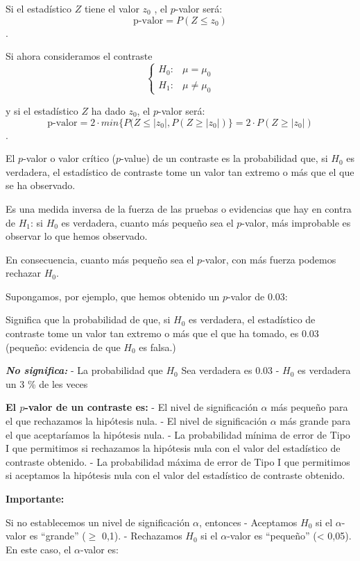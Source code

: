 \documentclass[
]{article}
\begin{document}
Si el estadístico \(Z\) tiene el valor \(z_0\) , el \(p\)-valor será:
\[ \text{p-valor} = P(Z \leq z_0)\].

Si ahora consideramos el contraste \[
\begin{cases}
H_0 : & \mu = \mu_0\\
H_1 : & \mu \neq \mu_0
\end{cases}
\]

y si el estadístico \(Z\) ha dado \(z_0\), el \(p\)-valor será:
\[ \text{p-valor} = 2 \cdot min\{P(Z \leq |z_0|, P(Z \geq |z_0|)\} = 2 \cdot P(Z \geq |z_0|)\].

El \(p\)-valor o valor crítico (\(p\)-value) de un contraste es la
probabilidad que, si \(H_0\) es verdadera, el estadístico de contraste
tome un valor tan extremo o más que el que se ha observado.

Es una medida inversa de la fuerza de las pruebas o evidencias que hay
en contra de \(H_1\): si \(H_0\) es verdadera, cuanto más pequeño sea el
\(p\)-valor, más improbable es observar lo que hemos observado.

En consecuencia, cuanto más pequeño sea el \(p\)-valor, con más fuerza
podemos rechazar \(H_0\).

Supongamos, por ejemplo, que hemos obtenido un \(p\)-valor de 0.03:

Significa que la probabilidad de que, si \(H_0\) es verdadera, el
estadístico de contraste tome un valor tan extremo o más que el que ha
tomado, es 0.03 (pequeño: evidencia de que \(H_0\) es falsa.)

\textbf{\emph{No significa:}} - La probabilidad que \(H_0\) Sea
verdadera es 0.03 - \(H_0\) es verdadera un 3 \% de les veces

\textbf{El \(p\)-valor de un contraste es:} - El nivel de significación
\(\alpha\) más pequeño para el que rechazamos la hipótesis nula. - El
nivel de significación \(\alpha\) más grande para el que aceptaríamos la
hipótesis nula. - La probabilidad mínima de error de Tipo I que
permitimos si rechazamos la hipótesis nula con el valor del estadístico
de contraste obtenido. - La probabilidad máxima de error de Tipo I que
permitimos si aceptamos la hipótesis nula con el valor del estadístico
de contraste obtenido.

\textbf{Importante:}

Si no establecemos un nivel de significación \(\alpha\), entonces -
Aceptamos \(H_0\) si el \(\alpha\)-valor es ``grande'' (\(\geq\) 0,1). -
Rechazamos \(H_0\) si el \(\alpha\)-valor es ``pequeño'' (\textless{}
0,05). En este caso, el \(\alpha\)-valor es:
\end{document}

